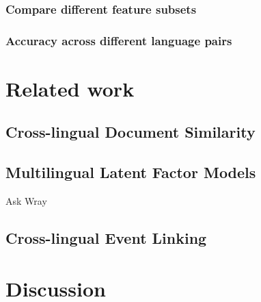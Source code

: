 \documentclass[twoside,11pt]{article}
\begin{document}
\subsubsection{Compare different feature subsets}

\subsubsection{Accuracy across different language pairs}


\section{Related work}

\subsection{Cross-lingual Document Similarity}

\subsection{Multilingual Latent Factor Models}

Ask Wray

\subsection{Cross-lingual Event Linking}


\section{Discussion}


\vskip 0.2in
%

\end{document}
